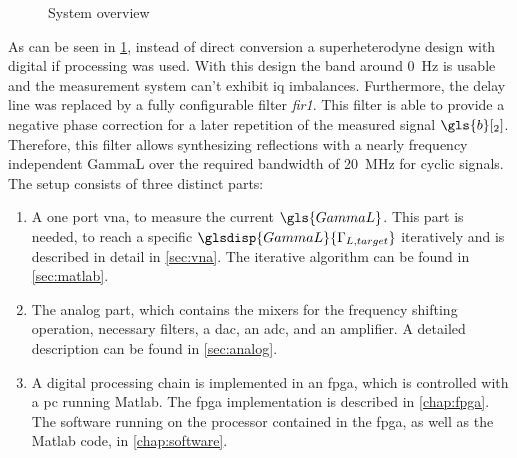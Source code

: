 \documentclass[12pt,a4paper,parskip=full,abstract=true,BCOR=12mm]{scrreprt}
\def\device#1{\mbox{\textit{#1}}}
\begin{document}
\begin{figure}[htb]
{
    }
    \caption{System overview}
    \label{fig:overall_hf}
\end{figure}

As can be seen in \cref{fig:overall_hf}, instead of direct conversion a superheterodyne design with digital \gls{if} processing
was used. With this design the band around \SI{0}{\hertz} is usable and the
measurement system can't exhibit \gls{iq} imbalances. Furthermore, the delay line was replaced by
a fully configurable filter \device{fir1}. This filter is able to provide a
negative phase correction for a later repetition of the measured signal $\gls{b}[_2]$.
Therefore, this filter allows synthesizing reflections with a nearly frequency
independent \gls{GammaL} over the required bandwidth of \SI{20}{\mega\hertz} for
cyclic signals. The setup consists of three distinct parts:

\begin{enumerate}
    \item A one port \gls{vna}, to measure the current $\gls{GammaL}$. This part is
needed, to reach a specific $\glsdisp{GammaL}{\Gamma_{L,target}}$ iteratively and is
described in detail in \cref{sec:vna}. The iterative algorithm can be found
in \cref{sec:matlab}.
    \item The analog part, which contains the mixers for the frequency shifting operation, necessary
        filters, a \gls{dac}, an \gls{adc}, and an amplifier. A detailed description can be found
        in \cref{sec:analog}.
    \item A digital processing chain is implemented in an \gls{fpga}, which is controlled with
a \gls{pc} running Matlab. The \gls{fpga} implementation is described in \cref{chap:fpga}.
The software running on the processor contained in the \gls{fpga}, as well as the Matlab
code, in \cref{chap:software}.
\end{enumerate}
\end{document}
